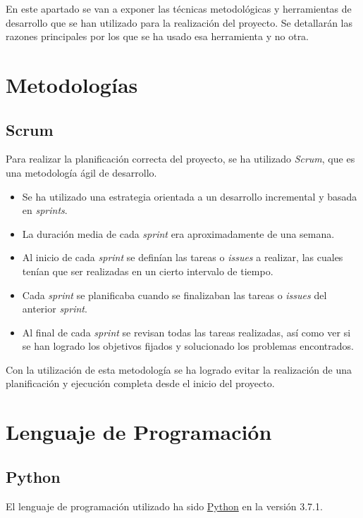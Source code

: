 En este apartado se van a exponer las técnicas metodológicas y herramientas de desarrollo que se han utilizado para la realización del proyecto. Se detallarán las razones principales por los que se ha usado esa herramienta y no otra.

\section{Metodologías}\label{metodologias}

\subsection{Scrum}\label{scrum}
Para realizar la planiﬁcación correcta del proyecto, se ha utilizado \emph{Scrum}, que es una metodología ágil de desarrollo.

\begin{itemize}
	\item Se ha utilizado una estrategia orientada a un desarrollo incremental y basada en \emph{sprints}.
	\item La duración media de cada \emph{sprint} era aproximadamente de una semana.
	\item Al inicio de cada \emph{sprint} se definían las tareas o \emph{issues} a realizar, las cuales tenían que ser realizadas en un cierto intervalo de tiempo.
	\item Cada \emph{sprint} se planificaba cuando se finalizaban las tareas o \emph{issues} del anterior \emph{sprint}.	
	\item Al final de cada \emph{sprint} se revisan todas las tareas realizadas, así como ver si se han logrado los objetivos fijados y solucionado los problemas encontrados.
\end{itemize}

Con la utilización de esta metodología se ha logrado evitar la realización de una planificación y ejecución completa desde el inicio del proyecto.



\section{Lenguaje de Programación}\label{lenguaje_de_programacion}
\subsection{Python}\label{python}
El lenguaje de programación utilizado ha sido \href {https://www.python.org/}{Python} en la versión 3.7.1.

